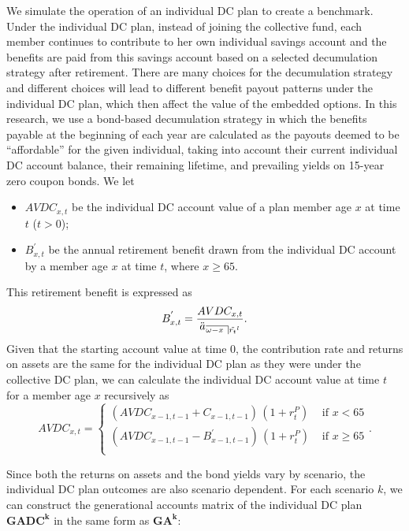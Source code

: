 \documentclass{sfuthesis}
\numberwithin{equation}{chapter}
\begin{document}
		\justify
		We simulate the operation of an individual DC plan to create a benchmark. Under the individual DC plan, instead of joining the collective fund, each member continues to contribute to her own individual savings account and the benefits are paid from this savings account based on a selected decumulation strategy after retirement. There are many choices for the decumulation strategy and different choices will lead to different benefit payout patterns under the individual DC plan, which then affect the value of the embedded options. In this research, we use a bond-based decumulation strategy in which the benefits payable at the beginning of each year are calculated as the payouts deemed to be ``affordable'' for the given individual, taking into account their current individual DC account balance, their remaining lifetime, and prevailing yields on 15-year zero coupon bonds. We let
		\begin{itemize}
			\item $AVDC_{x,t}$ be the individual DC account value of a plan member age $x$ at time $t$ ($t>0$);
			\item $B^{'}_{x,t}$ be the annual retirement benefit drawn from the individual DC account by a member age $x$ at time $t$, where $x \geqslant 65$.
		\end{itemize}
		This retirement benefit is expressed as
		\begin{equation}
		\label{eq:VB_12}
		B^{'}_{x,t} = \frac{AVDC_{x,t}}{\ddot{a}_{\angl{\omega -x}\tilde{r_{t}}^{l}}}.
		\end{equation}
		Given that the starting account value at time $0$, the contribution rate and returns on assets are the same for the individual DC plan as they were under the collective DC plan, we can calculate the individual DC account value at time $t$ for a member age $x$ recursively as
		\begin{equation}
		\label{eq:VB_13}
		AVDC_{x,t} =
		\left\{
		\begin{array}{ll}
		
		(AVDC_{x-1,t-1} + C_{x-1,t-1})\, (1+r_{t}^P) &\text{ if } x<65\\
		
		(AVDC_{x-1,t-1} - B_{x-1,t-1}^{'})\, (1+r_{t}^P) &\text{ if } x\geqslant 65\\
		\end{array}
		\right..
		\end{equation}
	
		\justify
		Since both the returns on assets and the bond yields vary by scenario, the individual DC plan outcomes are also scenario dependent. For each scenario $k$, we can construct the generational accounts matrix of the individual DC plan $\boldsymbol{GADC^{k}}$ in the same form as $\boldsymbol{GA^{k}}$:
		
\end{document}
